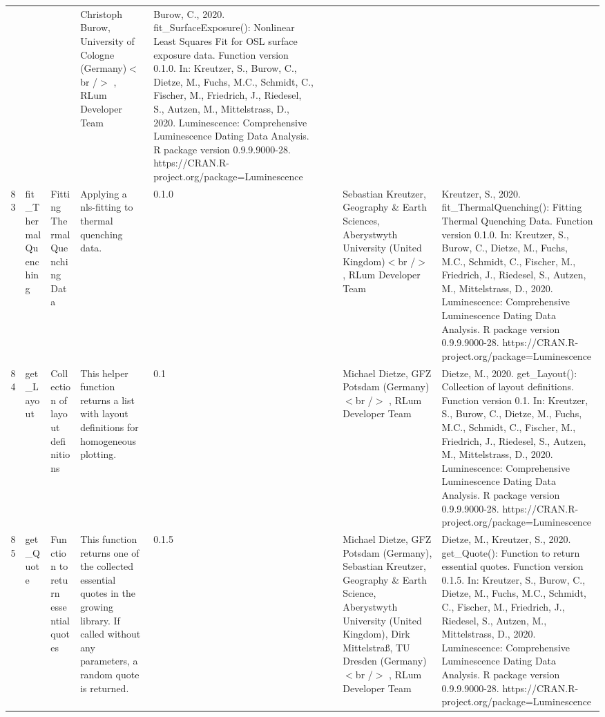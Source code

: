 \begin{table}[ht]
\begin{tabular}{rllllllll}
 &  &  & Christoph Burow, University of Cologne (Germany)$<$br /$>$ , RLum Developer Team & Burow, C., 2020. fit\_SurfaceExposure(): Nonlinear Least Squares Fit for OSL surface exposure data. Function version 0.1.0. In: Kreutzer, S., Burow, C., Dietze, M., Fuchs, M.C., Schmidt, C., Fischer, M., Friedrich, J., Riedesel, S., Autzen, M., Mittelstrass, D., 2020. Luminescence: Comprehensive Luminescence Dating Data Analysis. R package version 0.9.9.9000-28. https://CRAN.R-project.org/package=Luminescence
 \\ 
  83 & fit\_ThermalQuenching & Fitting Thermal Quenching Data & Applying a nls-fitting to thermal quenching data. & 0.1.0
 &  &  & Sebastian Kreutzer, Geography \& Earth Sciences, Aberystwyth University (United Kingdom)$<$br /$>$ , RLum Developer Team & Kreutzer, S., 2020. fit\_ThermalQuenching(): Fitting Thermal Quenching Data. Function version 0.1.0. In: Kreutzer, S., Burow, C., Dietze, M., Fuchs, M.C., Schmidt, C., Fischer, M., Friedrich, J., Riedesel, S., Autzen, M., Mittelstrass, D., 2020. Luminescence: Comprehensive Luminescence Dating Data Analysis. R package version 0.9.9.9000-28. https://CRAN.R-project.org/package=Luminescence
 \\ 
  84 & get\_Layout & Collection of layout definitions & This helper function returns a list with layout definitions for homogeneous plotting. & 0.1
 &  &  & Michael Dietze, GFZ Potsdam (Germany)$<$br /$>$ , RLum Developer Team & Dietze, M., 2020. get\_Layout(): Collection of layout definitions. Function version 0.1. In: Kreutzer, S., Burow, C., Dietze, M., Fuchs, M.C., Schmidt, C., Fischer, M., Friedrich, J., Riedesel, S., Autzen, M., Mittelstrass, D., 2020. Luminescence: Comprehensive Luminescence Dating Data Analysis. R package version 0.9.9.9000-28. https://CRAN.R-project.org/package=Luminescence
 \\ 
  85 & get\_Quote & Function to return essential quotes & This function returns one of the collected essential quotes in the growing library. If called without any parameters, a random quote is returned. & 0.1.5
 &  &  & Michael Dietze, GFZ Potsdam (Germany), Sebastian Kreutzer, Geography \& Earth Science, Aberystwyth University (United Kingdom), Dirk Mittelstraß, TU Dresden (Germany)$<$br /$>$ , RLum Developer Team & Dietze, M., Kreutzer, S., 2020. get\_Quote(): Function to return essential quotes. Function version 0.1.5. In: Kreutzer, S., Burow, C., Dietze, M., Fuchs, M.C., Schmidt, C., Fischer, M., Friedrich, J., Riedesel, S., Autzen, M., Mittelstrass, D., 2020. Luminescence: Comprehensive Luminescence Dating Data Analysis. R package version 0.9.9.9000-28. https://CRAN.R-project.org/package=Luminescence

\end{tabular}
\end{table}
